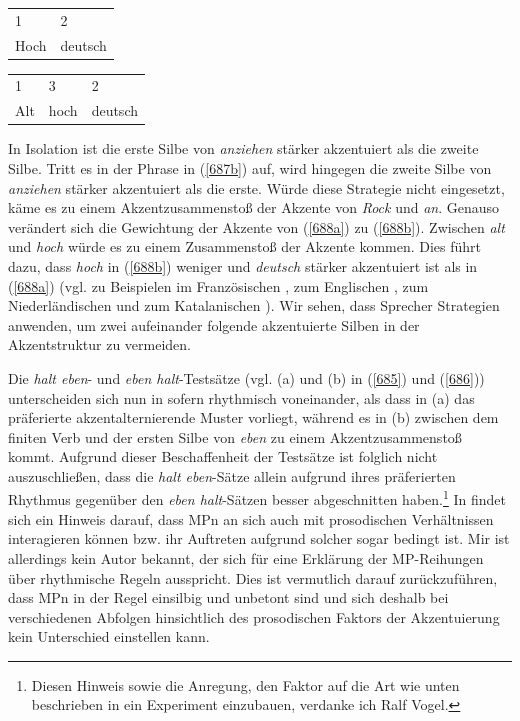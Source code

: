 \begin{exe}
	\ex\label{688} 
	\begin{xlist} 
	\ex\label{688a}
	\begin{tabular}[t]{ll}
	1 & 2 \\
	Hoch & deutsch
    \end{tabular}
    \ex\label{688b}
	\begin{tabular}[t]{lll}
	1 & 3 & 2 \\
	Alt & hoch & deutsch
    \end{tabular}
    \newline
    \hbox{}\hfill\hbox {\citet[1]{Wagner2002}}
\end{xlist}    
\end{exe}
In Isolation ist die erste Silbe von \textit{anziehen} stärker akzentuiert als die zweite Silbe. Tritt es in der Phrase in (\ref{687b}) auf, wird hingegen die zweite Silbe von \textit{anziehen} stärker akzentuiert als die erste. Würde diese Strategie nicht eingesetzt, käme es zu einem Akzentzusammenstoß der Akzente von \textit{Rock} und \textit{an}. Genauso verändert sich die Gewichtung der Akzente von (\ref{688a}) zu (\ref{688b}). Zwischen \textit{alt} und \textit{hoch} würde es zu einem Zusammenstoß der Akzente kommen. Dies führt dazu, dass \textit{hoch} in (\ref{688b}) weniger und \textit{deutsch} stärker akzentuiert ist als in (\ref{688a}) (vgl.  zu Beispielen im Französischen \citealt{Mazzola1992}, zum Englischen \citealt{Vogel1995}, zum Niederländischen \citealt[141]{Gussenhoven2004} und zum Katalanischen \citealt{Prieto2010}). Wir sehen, dass Sprecher Strategien anwenden, um zwei aufeinander folgende akzentuierte Silben in der Akzentstruktur zu vermeiden.

Die \textit{halt eben}- und \textit{eben halt}-Testsätze (vgl. (a) und (b) in (\ref{685}) und (\ref{686})) unterscheiden sich nun in sofern rhythmisch voneinander, als dass in (a) das präferierte akzentalternierende Muster vorliegt, während es in (b) zwischen dem finiten Verb und der ersten Silbe von \textit{eben} zu einem Akzentzusammenstoß kommt. Aufgrund dieser Beschaffenheit der Testsätze ist folglich nicht auszu\-schließen, dass die \textit{halt eben}-Sätze allein aufgrund ihres präferierten Rhythmus gegenüber den \textit{eben halt}-Sätzen besser abgeschnitten haben.\footnote{Diesen Hinweis sowie die Anregung, den Faktor auf die Art wie unten beschrieben in ein Experiment einzubauen, verdanke ich Ralf Vogel.} In \citet[32-33]{Franck1980} findet sich ein Hinweis darauf, dass MPn an sich auch mit prosodischen Verhältnissen interagieren können bzw. ihr Auftreten aufgrund solcher sogar bedingt ist. Mir ist allerdings kein Autor bekannt, der sich für eine Erklärung der MP-Reihungen über rhythmische Regeln ausspricht. Dies ist vermutlich darauf zurückzuführen, dass MPn in der Regel einsilbig und unbetont sind und sich deshalb bei verschiedenen Abfolgen hinsichtlich des prosodischen Faktors der Akzentuierung kein Unterschied einstellen kann. 

